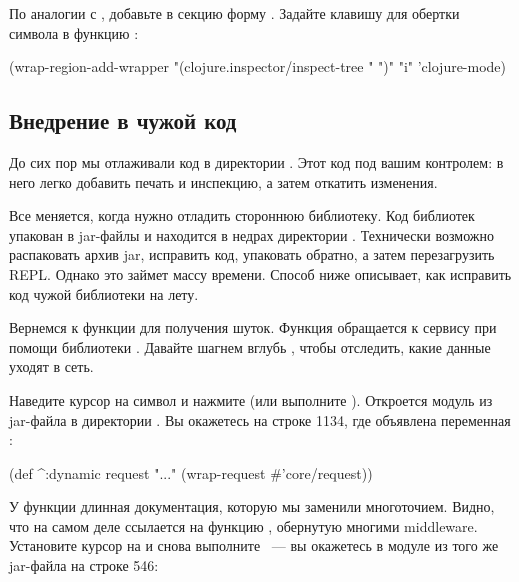 По аналогии с , добавьте в секцию  форму . Задайте клавишу для обертки символа в функцию :

\begin{english}
  \begin{clojure}
(wrap-region-add-wrapper
  "(clojure.inspector/inspect-tree "
  ")"
  "i"
  'clojure-mode)
  \end{clojure}
\end{english}

\subsection{Внедрение в чужой код}

До сих пор мы отлаживали код в директории . Этот код под вашим контролем: в него легко добавить печать и инспекцию, а затем откатить изменения.

Все меняется, когда нужно отладить стороннюю библиотеку. Код библиотек упакован в jar-файлы и находится в недрах директории . Технически возможно распаковать архив jar, исправить код, упаковать обратно, а затем перезагрузить REPL. Однако это займет массу времени. Способ ниже описывает, как исправить код чужой библиотеки на лету.

Вернемся к функции  для получения шуток. Функция обращается к сервису при помощи библиотеки . Давайте шагнем вглубь , чтобы отследить, какие данные уходят в сеть.

Наведите курсор на символ  и нажмите  (или выполните ). Откроется модуль  из jar-файла в директории . Вы окажетесь на строке 1134, где объявлена переменная :

\begin{english}
  \begin{clojure}
(def ^:dynamic request
  "..."
  (wrap-request #'core/request))
  \end{clojure}
\end{english}

У функции длинная документация, которую мы заменили многоточием. Видно, что  на самом деле ссылается на функцию , обернутую многими middleware. Установите курсор на  и снова выполните ~--- вы окажетесь в модуле  из того же jar-файла на строке 546:


